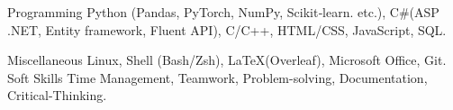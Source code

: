 

\begin{cvskills}

  \cvskill
    {Programming} %
    {Python (Pandas, PyTorch, NumPy, Scikit‑learn. etc.), C\#(ASP .NET, Entity framework, Fluent API), C/C++, HTML/CSS, JavaScript, SQL.} %

  \cvskill
    {Miscellaneous} %
    {Linux, Shell (Bash/Zsh), \LaTeX (Overleaf), Microsoft Office, Git.} %
  \cvskill
    {Soft Skills} %
    {Time Management, Teamwork, Problem-solving, Documentation, Critical-Thinking.} %

\end{cvskills}

